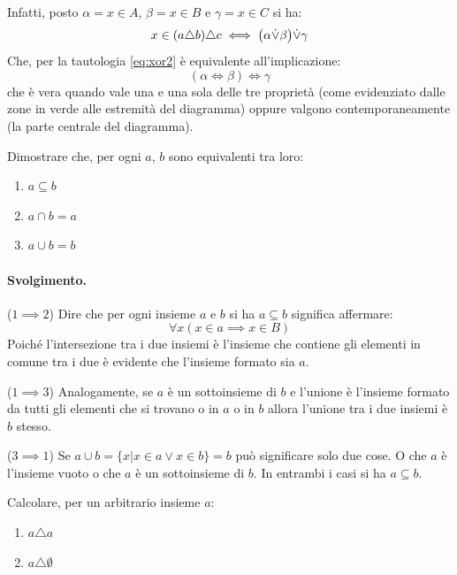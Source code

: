 Infatti, posto $\alpha= x \in A$, $\beta=x \in B$ e $\gamma=x\in C$ si ha:
\begin{displaymath}
	x \in	(a \triangle b)\triangle c \iff \bigl( \alpha {\displaystyle{\dot{\vee}}} \beta \bigr) {\displaystyle{\dot{\vee}}} \gamma
\end{displaymath}
Che, per la tautologia \ref{eq:xor2} è equivalente all'implicazione:
\begin{displaymath}
	(\alpha \iff \beta) \iff \gamma
\end{displaymath}
che è vera quando vale una e una sola delle tre proprietà (come evidenziato dalle zone in verde alle estremità del diagramma) oppure valgono contemporaneamente (la parte centrale del diagramma).  \hfill \blacksquare

\begin{exsbox}
	Dimostrare che, per ogni $a$, $b$ sono equivalenti tra loro:
	\begin{enumerate}
		\item $a \subseteq b$
		\item $a \cap b = a$
		\item $a \cup b = b$
	\end{enumerate}
\end{exsbox}
\paragraph{Svolgimento.} ($1 \implies 2$) Dire che per ogni insieme $a$ e $b$ si ha $a \subseteq b$ significa affermare:
\begin{displaymath}
	\forall x (x \in a \implies x \in B)
\end{displaymath}
Poiché l'intersezione tra i due insiemi è l'insieme che contiene gli elementi in comune tra i due è evidente che l'insieme formato sia $a$.

($1 \implies 3$) Analogamente, se $a$ è un sottoinsieme di $b$ e l'unione è l'insieme formato da tutti gli elementi che si trovano o in $a$ o in $b$ allora l'unione tra i due insiemi è $b$ stesso.

($3 \implies 1$) Se $a \cup b = \{x | x \in a \lor x \in b\} = b$ può significare solo due cose. O che $a$ è l'insieme vuoto o che $a$ è un sottoinsieme di $b$. In entrambi i casi si ha $a \subseteq b$. \hfill \blacksquare

\begin{exsbox}
	Calcolare, per un arbitrario insieme $a$:
	\begin{enumerate}
		\item $a \triangle a$
		\item $a \triangle \emptyset $
	\end{enumerate}
\end{exsbox}
